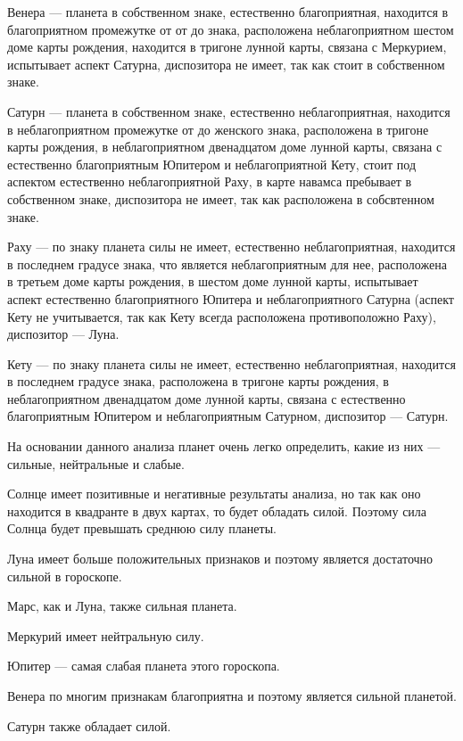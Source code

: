 Венера --- планета в собственном знаке, естественно благоприятная, находится в благоприятном промежутке от от  до  знака, расположена неблагоприятном шестом доме карты рождения, находится в тригоне лунной карты, связана с Меркурием, испытывает аспект Сатурна, диспозитора не имеет, так как стоит в собственном знаке.


Сатурн --- планета в собственном знаке, естественно неблагоприятная, находится в неблагоприятном промежутке от  до  женского знака, расположена в тригоне карты рождения, в неблагоприятном двенадцатом доме лунной карты, связана с естественно благоприятным Юпитером и неблагоприятной Кету, стоит под аспектом естественно неблагоприятной Раху, в карте навамса пребывает в собственном знаке, диспозитора не имеет, так как расположена в собсвтенном знаке.

Раху --- по знаку планета силы не имеет, естественно неблагоприятная, находится в последнем градусе знака, что является неблагоприятным для нее, расположена в третьем доме карты рождения, в шестом доме лунной карты, испытывает аспект естественно благоприятного Юпитера и неблагоприятного Сатурна (аспект Кету не учитывается, так как Кету всегда расположена противоположно Раху), диспозитор --- Луна.

Кету --- по знаку планета силы не имеет, естественно неблагоприятная, находится в последнем градусе знака, расположена в тригоне карты рождения, в неблагоприятном двенадцатом доме лунной карты, связана с естественно благоприятным Юпитером и неблагоприятным Сатурном, диспозитор --- Сатурн.

На основании данного анализа планет очень легко определить, какие из них --- сильные, нейтральные и слабые.

Солнце имеет позитивные и негативные результаты анализа, но так как оно находится в квадранте в двух картах, то будет обладать силой. Поэтому сила Солнца будет превышать среднюю силу планеты.

Луна имеет больше положительных признаков и поэтому является достаточно сильной в гороскопе.

Марс, как и Луна, также сильная планета.

Меркурий имеет нейтральную силу.

Юпитер --- самая слабая планета этого гороскопа.

Венера по многим признакам благоприятна и поэтому является сильной планетой.

Сатурн также обладает силой.

